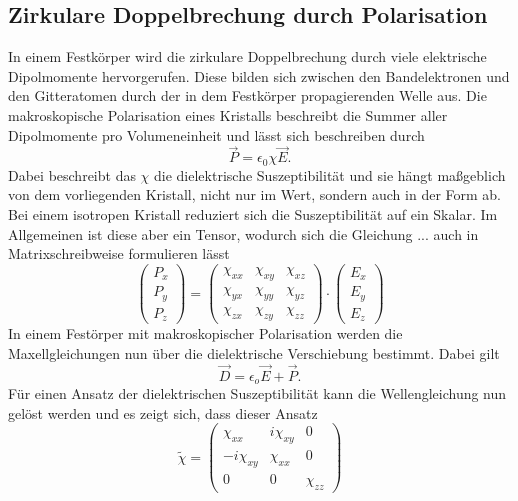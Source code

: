 \subsection{Zirkulare Doppelbrechung durch Polarisation}
In einem Festkörper wird die zirkulare Doppelbrechung durch viele elektrische Dipolmomente hervorgerufen. Diese bilden sich zwischen den Bandelektronen
und den Gitteratomen durch der in dem Festkörper propagierenden Welle aus.
Die makroskopische Polarisation eines Kristalls beschreibt die Summer aller Dipolmomente pro Volumeneinheit und lässt sich beschreiben durch
\begin{equation}
\vec{P} = \epsilon_0 \chi \vec{E}.
\end{equation}
Dabei beschreibt das $\chi$ die dielektrische Suszeptibilität und sie hängt maßgeblich von dem vorliegenden Kristall, nicht nur im Wert, sondern auch in der Form ab.
Bei einem isotropen Kristall reduziert sich die Suszeptibilität auf ein Skalar. Im Allgemeinen ist diese aber ein Tensor, wodurch sich die Gleichung ... auch in Matrixschreibweise formulieren lässt
\begin{equation}
\begin{pmatrix}
P_x \\
P_y \\
P_z 
\end{pmatrix} = 
\begin{pmatrix}
\chi_{xx} & \chi_{xy} & \chi_{xz} \\
\chi_{yx} & \chi_{yy} & \chi_{yz} \\
\chi_{zx} & \chi_{zy} & \chi_{zz}
\end{pmatrix}
\cdot 
\begin{pmatrix}
E_x \\
E_y \\
E_z 
\end{pmatrix}
\end{equation}
In einem Festörper mit makroskopischer Polarisation werden die Maxellgleichungen nun über die dielektrische Verschiebung bestimmt. 
Dabei gilt
\begin{equation}
\vec{D} = \epsilon_o \vec{E} + \vec{P}.
\end{equation}
Für einen Ansatz der dielektrischen Suszeptibilität kann die Wellengleichung nun gelöst werden und es zeigt sich, dass dieser Ansatz
\begin{equation}
    \tilde{\chi} = \begin{pmatrix}
        \chi_{xx} & i\chi_{xy} & 0 \\
        -i\chi_{xy} & \chi_{xx} & 0 \\
        0 & 0 & \chi_{zz}
        \end{pmatrix}
\end{equation}
